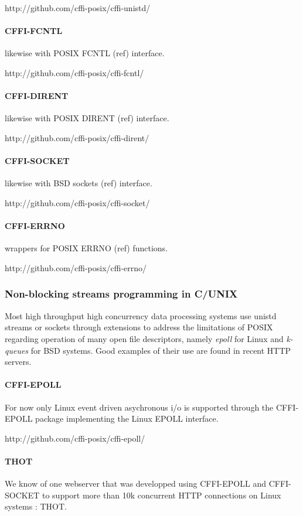 \documentclass[sigconf]{acmart}
\begin{document}
http://github.com/cffi-posix/cffi-unistd/

\paragraph{CFFI-FCNTL}
likewise with POSIX FCNTL (ref) interface.

http://github.com/cffi-posix/cffi-fcntl/

\paragraph{CFFI-DIRENT}
likewise with POSIX DIRENT (ref) interface.

http://github.com/cffi-posix/cffi-dirent/

\paragraph{CFFI-SOCKET}
likewise with BSD sockets (ref) interface.

http://github.com/cffi-posix/cffi-socket/

\paragraph{CFFI-ERRNO}
wrappers for POSIX ERRNO (ref) functions.

http://github.com/cffi-posix/cffi-errno/


\subsubsection{Non-blocking streams programming in C/UNIX}
Most high throughput high concurrency data processing systems use
unistd streams or sockets through extensions to address the
limitations of POSIX regarding operation of many open file
descriptors, namely {\em epoll} for Linux and {\em k-queues} for BSD
systems. Good examples of their use are found in recent HTTP servers.

\paragraph{CFFI-EPOLL}
For now only Linux event driven asychronous i/o is supported through the
CFFI-EPOLL package implementing the Linux EPOLL interface.

http://github.com/cffi-posix/cffi-epoll/

\paragraph{THOT}
We know of one webserver that was developped using CFFI-EPOLL and
CFFI-SOCKET to support more than 10k concurrent HTTP connections
on Linux systems : THOT.
\end{document}

